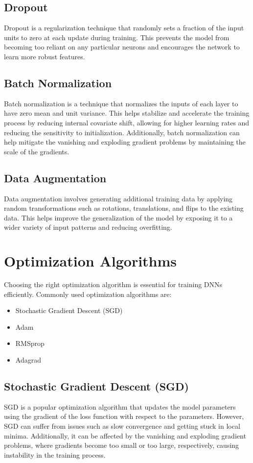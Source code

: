 \documentclass[12pt]{article}
\begin{document}
\subsection{Dropout}
Dropout is a regularization technique that randomly sets a fraction of the input units to zero at each update during training. This prevents the model from becoming too reliant on any particular neurons and encourages the network to learn more robust features.

\subsection{Batch Normalization}
Batch normalization is a technique that normalizes the inputs of each layer to have zero mean and unit variance. This helps stabilize and accelerate the training process by reducing internal covariate shift, allowing for higher learning rates and reducing the sensitivity to initialization. Additionally, batch normalization can help mitigate the vanishing and exploding gradient problems by maintaining the scale of the gradients.

\subsection{Data Augmentation}
Data augmentation involves generating additional training data by applying random transformations such as rotations, translations, and flips to the existing data. This helps improve the generalization of the model by exposing it to a wider variety of input patterns and reducing overfitting.

\section{Optimization Algorithms}
Choosing the right optimization algorithm is essential for training DNNs efficiently. Commonly used optimization algorithms are:
\begin{itemize}
    \item Stochastic Gradient Descent (SGD)
    \item Adam
    \item RMSprop
    \item Adagrad
\end{itemize}

\subsection{Stochastic Gradient Descent (SGD)}
SGD is a popular optimization algorithm that updates the model parameters using the gradient of the loss function with respect to the parameters. However, SGD can suffer from issues such as slow convergence and getting stuck in local minima. Additionally, it can be affected by the vanishing and exploding gradient problems, where gradients become too small or too large, respectively, causing instability in the training process.
\end{document}
